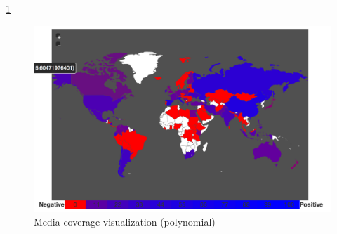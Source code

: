 \documentclass{acm_proc_10ptArticle-sp}
\begin{document}
\ref{screenshot:coverage}
\begin{figure}[H]
  \centering
  \includegraphics[width=0.9\linewidth]{img/media-coverage-polynomial.png}
  \caption{Media coverage visualization (polynomial)}
  \label{screenshot:coverage}
\end{figure}







\end{document}
